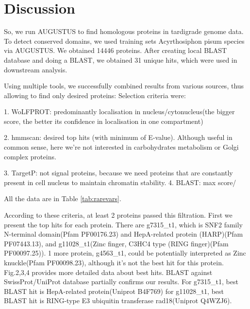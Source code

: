 \documentclass{article}
\begin{document}
 
 
\section{Discussion}
 So, we run AUGUSTUS to find homologous proteins in tardigrade genome data. To detect conserved domains, we used training sets Acyrthosiphon pisum species via AUGUSTUS. We obtained 14446 proteins. After creating local BLAST database and doing a BLAST, we obtained 31 unique hits, which were used in downstream analysis.
 
 Using multiple tools, we successfully combined results from various sources, thus allowing to find only desired proteins: Selection criteria were:
 
 1. WoLFPROT: predominantly localisation in nucleus/cytonucleus(the bigger score, the better its confidence in localisation in one compartment)
 
 2. hmmscan: desired top hits (with minimum of E-value). Although useful in common sense, here we're not interested in carbohydrates metabolism or Golgi complex proteins.
 
 3. TargetP: not signal proteins, because we need proteins that are constantly present in cell nucleus to maintain chromatin stability.
 4. BLAST: max score/%
 
 All the data are in Table \ref{tab:rarevars}.
 
 According to these criteria, at least 2 proteins passed this filtration. First we present the top hits for each protein. There are g7315_t1, which is SNF2 family N-terminal domain(Pfam PF00176.23) and HepA-related protein (HARP)(Pfam PF07443.13), and g11028\_t1(Zinc finger, C3HC4 type (RING finger)(Pfam PF00097.25)). 1 more protein, g4563_t1, could be potentially interpreted as Zinc knuckle(Pfam PF00098.23), although it's not the best hit for this protein. Fig.2,3,4 provides more detailed data about best hits. BLAST against SwissProt/UniProt database partially confirms our results. For g7315_t1, best BLAST hit is HepA-related protein(Uniprot B4F769) for g11028_t1, best BLAST hit is RING-type E3 ubiquitin transferase rad18(Uniprot Q4WZJ6).
 
\end{document}
